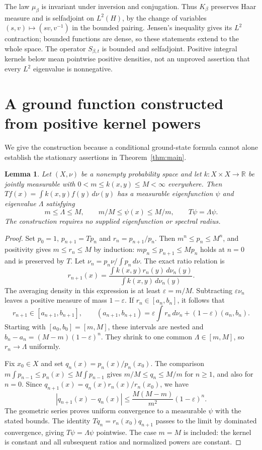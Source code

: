 \documentclass[11pt]{article}
\newtheorem{lemma}[theorem]{Lemma}
\newcommand{\R}{\mathbb R}\newcommand{\E}{\mathbb E}
\begin{document}
The law $\mu_\beta$ is invariant under inversion and conjugation.
Thus $K_\beta$ preserves Haar measure and is selfadjoint on $L^2(H)$,
by the change of variables $(s,v)\mapsto(sv,v^{-1})$ in the bounded
pairing. Jensen's inequality gives its $L^2$ contraction; bounded
functions are dense, so these statements extend to the whole space.
The operator $S_{\beta,t}$ is bounded and selfadjoint. Positive
integral kernels below mean pointwise positive densities, not an
unproved assertion that every $L^2$ eigenvalue is nonnegative.

\section{A ground function constructed from positive kernel powers}
We give the construction because a conditional ground-state formula
cannot alone establish the stationary assertions in Theorem~\ref{thm:main}.

\begin{lemma}\label{lem:positivepowers}
Let $(X,\nu)$ be a nonempty probability space and let $k:X\times X\to\R$
be jointly measurable with $0<m\leq k(x,y)\leq M<\infty$ everywhere.
Then $Tf(x)=\int k(x,y)f(y)\,d\nu(y)$ has a measurable eigenfunction
$\psi$ and eigenvalue $\Lambda$ satisfying
\[
 m\leq\Lambda\leq M,\qquad m/M\leq\psi(x)\leq M/m,
 \qquad T\psi=\Lambda\psi.
\]
The construction requires no supplied eigenfunction or spectral radius.
\end{lemma}
\begin{proof}
Set $p_0=1$, $p_{n+1}=Tp_n$ and $r_n=p_{n+1}/p_n$.
Then $m^n\leq p_n\leq M^n$, and positivity gives
$m\leq r_n\leq M$ by induction: $mp_n\leq p_{n+1}\leq Mp_n$
holds at $n=0$ and is preserved by $T$.
Let $\nu_n=p_n\nu/\int p_n\,d\nu$. The exact ratio relation is
\[
 r_{n+1}(x)=\frac{\int k(x,y)r_n(y)\,d\nu_n(y)}
                         {\int k(x,y)\,d\nu_n(y)}.
\]
The averaging density in this expression is at least
$\varepsilon=m/M$. Subtracting $\varepsilon\nu_n$ leaves a positive
measure of mass $1-\varepsilon$. If $r_n\in[a_n,b_n]$, it follows that
\[
 r_{n+1}\in[a_{n+1},b_{n+1}],\qquad
 (a_{n+1},b_{n+1})=
 \varepsilon\!\int r_n\,d\nu_n+(1-\varepsilon)(a_n,b_n).
\]
Starting with $[a_0,b_0]=[m,M]$, these intervals are nested and
$b_n-a_n=(M-m)(1-\varepsilon)^n$. They shrink to one common
$\Lambda\in[m,M]$, so $r_n\to\Lambda$ uniformly.

Fix $x_0\in X$ and set $q_n(x)=p_n(x)/p_n(x_0)$.
The comparison $m\int p_{n-1}\leq p_n(x)\leq M\int p_{n-1}$ gives
$m/M\leq q_n\leq M/m$ for $n\geq1$, and also for $n=0$.
Since $q_{n+1}(x)=q_n(x)r_n(x)/r_n(x_0)$, we have
\[
 |q_{n+1}(x)-q_n(x)|
 \leq\frac{M(M-m)}{m^2}(1-\varepsilon)^n.
\]
The geometric series proves uniform convergence to a measurable
$\psi$ with the stated bounds. The identity
$Tq_n=r_n(x_0)q_{n+1}$ passes to the limit by dominated convergence,
giving $T\psi=\Lambda\psi$ pointwise. The case $m=M$ is included:
the kernel is constant and all subsequent ratios and normalized powers
are constant.
\end{proof}
\end{document}
